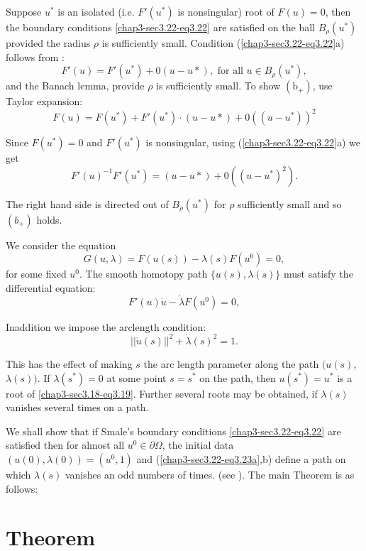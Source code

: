 Suppose $u^*$ is an isolated (i.e. $F'(u^*)$ is nonsingular) root of
$F(u) = 0$, then the boundary conditions \eqref{chap3-sec3.22-eq3.22}
are satisfied on 
the ball $B_{\rho}(u^*)$ provided the radius $\rho$ is sufficiently
small. Condition (\ref{chap3-sec3.22-eq3.22}a) follows from :  
$$
F'(u) = F'(u^*) + 0(u-u*), \text{ for all } u \in B_{\rho}(u^*), 
$$ 
and the Banach lemma, provide  ${\rho}$ is sufficiently small. To show
$(\text{b}_+)$, use Taylor expansion: 
$$
F(u) = F(u^*) + F'(u^*) \cdot (u-u*) +0((u-u^*))^2
$$

Since $F(u^*) = 0$ and $F'(u^*)$ is nonsingular, using
(\ref{chap3-sec3.22-eq3.22}a) we 
get  
$$
F'(u)^{-1}  F'(u^*) = (u-u*) + 0((u-u^*)^2).
$$

The right hand side is directed out of $B_{\rho}(u^*)$ for $\rho$
sufficiently small and so $(b_+)$ holds. 

We consider the equation
$$
G(u, \lambda) = F(u(s)) - \lambda(s) F(u^0) = 0, 
$$
for some fixed $u^0$. The smooth homotopy path $\{ u (s) , \lambda (s)
\}$ must satisfy the differential equation: 
\begin{equation*}
F' (u) \dot{u} - \dot{\lambda}F(u^0) = 0,
\tag{3.23a}\label{chap3-sec3.22-eq3.23a} 
\end{equation*}

In\pageoriginale addition we impose the arclength condition: 
\begin{equation*}
 || \dot{u}(s) ||^2 + \dot{\lambda} (s)^2 =
 1. \tag{3.23b}\label{chap3-sec3.22-eq3.23b}  
 \end{equation*} 
 
This has the effect of making $s$ the arc length parameter along the
path $(u(s)$, $\lambda (s))$. If $\lambda(s^*) = 0$ at some point $s
 = s^*$ on the path, then $u(s^*) = u^*$ is a root of
 \eqref{chap3-sec3.18-eq3.19}. Further several roots may be obtained,
 if $\lambda(s)$ vanishes several times on a path. 
 
 We shall show that if Smale's boundary conditions
 \eqref{chap3-sec3.22-eq3.22} are
 satisfied then for almost all $u^0 \in \partial \Omega$, the initial
 data $(u(0), \lambda (0)) = (u^0,1)$ and
 (\ref{chap3-sec3.22-eq3.23a},b) define a path 
 on which $\lambda (s)$ vanishes an odd numbers of times. (see
 \cite{key20}). The main Theorem is as follows: 
  
\setcounter{section}{23}
\section{Theorem}\label{chap3-sec3.24}

